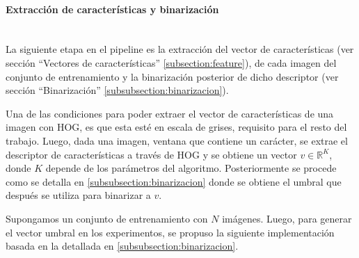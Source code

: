 
		\paragraph{Extracción de características y binarización} ~\\
		
			La siguiente etapa en el pipeline es la extracción del vector de características (ver sección ``Vectores de características'' \ref{subsection:feature}), de cada imagen del conjunto de entrenamiento y la binarización posterior de dicho descriptor (ver sección ``Binarización'' \ref{subsubsection:binarizacion}).
			
			Una de las condiciones para poder extraer el vector de características de una imagen con HOG, es que esta esté en escala de grises, requisito para el resto del trabajo. Luego, dada una imagen, ventana que contiene un carácter, se extrae el descriptor de características a través de HOG y se obtiene un vector $v \in \mathbb{R}^{K}$, donde $K$ depende de los parámetros del algoritmo. Posteriormente se procede como se detalla en \ref{subsubsection:binarizacion} donde se obtiene el umbral que después se utiliza para binarizar a $v$.
			
			Supongamos un conjunto de entrenamiento con $N$ imágenes. Luego, para generar el vector umbral en los experimentos, se propuso la siguiente implementación basada en la detallada en \ref{subsubsection:binarizacion}.
			
